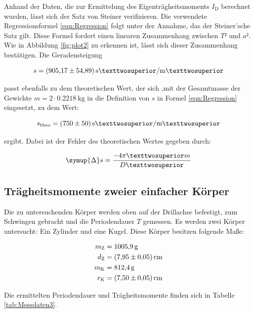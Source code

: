 Anhand der Daten, die zur Ermittelung des Eigenträgheitsmoments $I_\text{D}$ berechnet wurden, lässt sich der
Satz von Steiner verifizieren. Die verwendete Regressionsformel \eqref{eqn:Regression} folgt unter der
Annahme, das der Steiner'sche Satz gilt. Diese Formel fordert einen linearen Zusammenhang zwischen 
$T²$ und $a²$. Wie in Abbildung \ref{fig:plot2} zu erkennen ist, lässt sich dieser Zusammenhang 
bestätigen. Die Geradensteigung

\begin{equation*}
s = \SI{905.17+-54.89}{\second²\per\meter²}
\end{equation*}

passt ebenfalls zu dem theoretischen Wert, der sich ,mit der Gesamtmasse der Gewichte  $m = 2\cdot 
\SI{0.2218}{\kilo\gram}$ in die Definition von $s$ in Formel \eqref{eqn:Regression} eingesetzt, zu 
dem Wert:

\begin{equation*}
s_\text{theo} = \SI{750+-50}{\second²\per\meter²}
\end{equation*}

ergibt.
Dabei ist der Fehler des theoretischen Wertes gegeben durch:

\begin{equation*}
\symup{\Delta} s = \frac{-4\pi²m}{D²} 
\end{equation*}

\subsection{Trägheitsmomente zweier einfacher Körper}

Die zu untersuchenden Körper werden oben auf der Drillachse befestigt, zum Schwingen gebracht 
und die Periodendauer $T$ gemessen. Es werden zwei Körper untersucht: Ein Zylinder und eine Kugel.
Diese Körper besitzen folgende Maße: 

\begin{align*}
m_\text{Z} &= \SI{1005.9}{\gram}\\
d_\text{Z} &= \SI{7.95+-0.05}{\centi\meter}\\
m_\text{K} &= \SI{812.4}{\gram}\\
r_\text{K} &= \SI{7.5+-0.05}{\centi\meter} 
\end{align*}

Die ermittelten Periodendauer und Trägheitsmomente finden sich in Tabelle \ref{tab:Messdaten3}.

